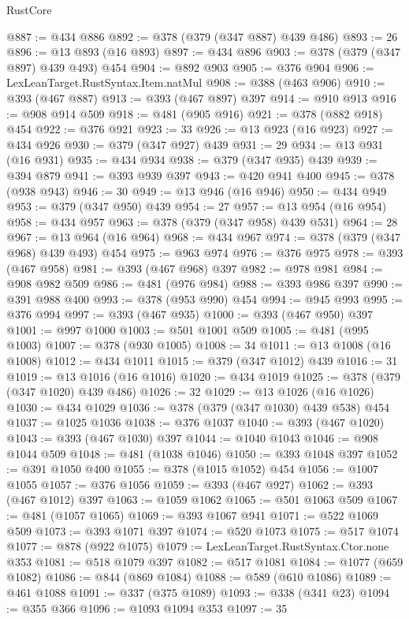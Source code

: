 \begin{lexlean}{RustCore}
\begin{coremodule}
@887 := @434 @886
@892 := @378 (@379 (@347 @887) @439 @486)
@893 := 26
@896 := @13 @893 (@16 @893)
@897 := @434 @896
@903 := @378 (@379 (@347 @897) @439 @493) @454
@904 := @892 @903
@905 := @376 @904
@906 := LexLeanTarget.RustSyntax.Item.natMul
@908 := @388 (@463 @906)
@910 := @393 (@467 @887)
@913 := @393 (@467 @897) @397
@914 := @910 @913
@916 := @908 @914 @509
@918 := @481 (@905 @916)
@921 := @378 (@882 @918) @454
@922 := @376 @921
@923 := 33
@926 := @13 @923 (@16 @923)
@927 := @434 @926
@930 := @379 (@347 @927) @439
@931 := 29
@934 := @13 @931 (@16 @931)
@935 := @434 @934
@938 := @379 (@347 @935) @439
@939 := @394 @879
@941 := @393 @939 @397
@943 := @420 @941 @400
@945 := @378 (@938 @943)
@946 := 30
@949 := @13 @946 (@16 @946)
@950 := @434 @949
@953 := @379 (@347 @950) @439
@954 := 27
@957 := @13 @954 (@16 @954)
@958 := @434 @957
@963 := @378 (@379 (@347 @958) @439 @531)
@964 := 28
@967 := @13 @964 (@16 @964)
@968 := @434 @967
@974 := @378 (@379 (@347 @968) @439 @493) @454
@975 := @963 @974
@976 := @376 @975
@978 := @393 (@467 @958)
@981 := @393 (@467 @968) @397
@982 := @978 @981
@984 := @908 @982 @509
@986 := @481 (@976 @984)
@988 := @393 @986 @397
@990 := @391 @988 @400
@993 := @378 (@953 @990) @454
@994 := @945 @993
@995 := @376 @994
@997 := @393 (@467 @935)
@1000 := @393 (@467 @950) @397
@1001 := @997 @1000
@1003 := @501 @1001 @509
@1005 := @481 (@995 @1003)
@1007 := @378 (@930 @1005)
@1008 := 34
@1011 := @13 @1008 (@16 @1008)
@1012 := @434 @1011
@1015 := @379 (@347 @1012) @439
@1016 := 31
@1019 := @13 @1016 (@16 @1016)
@1020 := @434 @1019
@1025 := @378 (@379 (@347 @1020) @439 @486)
@1026 := 32
@1029 := @13 @1026 (@16 @1026)
@1030 := @434 @1029
@1036 := @378 (@379 (@347 @1030) @439 @538) @454
@1037 := @1025 @1036
@1038 := @376 @1037
@1040 := @393 (@467 @1020)
@1043 := @393 (@467 @1030) @397
@1044 := @1040 @1043
@1046 := @908 @1044 @509
@1048 := @481 (@1038 @1046)
@1050 := @393 @1048 @397
@1052 := @391 @1050 @400
@1055 := @378 (@1015 @1052) @454
@1056 := @1007 @1055
@1057 := @376 @1056
@1059 := @393 (@467 @927)
@1062 := @393 (@467 @1012) @397
@1063 := @1059 @1062
@1065 := @501 @1063 @509
@1067 := @481 (@1057 @1065)
@1069 := @393 @1067 @941
@1071 := @522 @1069 @509
@1073 := @393 @1071 @397
@1074 := @520 @1073
@1075 := @517 @1074
@1077 := @878 (@922 @1075)
@1079 := LexLeanTarget.RustSyntax.Ctor.none @353
@1081 := @518 @1079 @397
@1082 := @517 @1081
@1084 := @1077 (@659 @1082)
@1086 := @844 (@869 @1084)
@1088 := @589 (@610 @1086)
@1089 := @461 @1088
@1091 := @337 (@375 @1089)
@1093 := @338 (@341 @23)
@1094 := @355 @366
@1096 := @1093 @1094 @353
@1097 := 35

\end{coremodule}
\end{lexlean}
